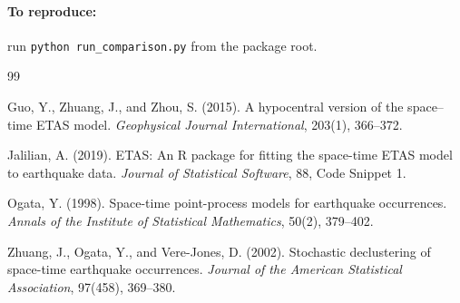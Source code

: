 \documentclass[11pt,a4paper]{article}
\theoremstyle{plain}
\theoremstyle{definition}
\begin{document}
\paragraph{To reproduce:} run \texttt{python run\_comparison.py} from the
package root.

\renewcommand{\refname}{References}
\begin{thebibliography}{99}

Guo, Y., Zhuang, J., and Zhou, S. (2015).
\newblock A hypocentral version of the space--time ETAS model.
\newblock \emph{Geophysical Journal International}, 203(1), 366--372.

Jalilian, A. (2019).
\newblock ETAS: An R package for fitting the space-time ETAS model to
earthquake data.
\newblock \emph{Journal of Statistical Software}, 88, Code Snippet 1.

Ogata, Y. (1998).
\newblock Space-time point-process models for earthquake occurrences.
\newblock \emph{Annals of the Institute of Statistical Mathematics},
50(2), 379--402.

Zhuang, J., Ogata, Y., and Vere-Jones, D. (2002).
\newblock Stochastic declustering of space-time earthquake occurrences.
\newblock \emph{Journal of the American Statistical Association},
97(458), 369--380.

\end{thebibliography}
\end{document}
